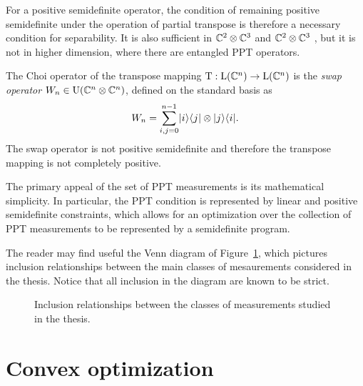 For a positive semidefinite operator, the condition of remaining positive semidefinite under 
the operation of partial transpose is therefore a necessary condition for separability. 
It is also sufficient in $\mathbb{C}^{2}\otimes\mathbb{C}^{3}$ and 
$\mathbb{C}^{2}\otimes\mathbb{C}^{3}$ \cite{Peres1996,Horodecki1996}, 
but it is not in higher dimension, where there are entangled PPT operators. 

The Choi operator of the transpose mapping $\operatorname{T} : \mathrm{L}(\mathbb{C}^{n})\to\mathrm{L}(\mathbb{C}^{n})$
is the \emph{swap operator} 
$W_{n} \in \mathrm{U}(\mathbb{C}^{n}\otimes\mathbb{C}^{n})$, defined on the standard basis as
\begin{equation}
\label{eq:swap-operator}
  W_{n} = \sum_{i,j=0}^{n-1}\lvert\mspace{0.5mu} i \mspace{0.5mu} \rangle\langle\mspace{0.5mu} j \mspace{0.5mu} \rvert\otimes\lvert\mspace{0.5mu} j \mspace{0.5mu} \rangle\langle\mspace{0.5mu} i \mspace{0.5mu} \rvert.
\end{equation}
The swap operator is not positive semidefinite and therefore the transpose
mapping is not completely positive.

The primary appeal of the set of PPT measurements is its mathematical simplicity.
In particular, the PPT condition is represented by linear and positive
semidefinite constraints, which allows for an optimization over the collection
of PPT measurements to be represented by a semidefinite program.

The reader may find useful the Venn diagram of Figure~\ref{fig:classes-measurements}, 
which pictures inclusion relationships between the main classes of mesaurements
considered in the thesis. Notice that all inclusion in the diagram are known
to be strict.

\begin{figure}[!ht]
  \centering
    \def\svgwidth{200pt}
    \scalebox{.75}{}
    \caption{Inclusion relationships between the classes of measurements studied 
      in the thesis.}
    \label{fig:classes-measurements}
\end{figure}

\section{Convex optimization}
\label{sec:convex-optimization}

